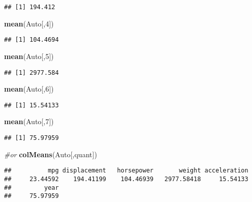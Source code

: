 \documentclass[]{article}
\newenvironment{Shaded}{\begin{snugshade}}{\end{snugshade}}
\newcommand{\CommentTok}[1]{\textcolor[rgb]{0.56,0.35,0.01}{\textit{#1}}}
\newcommand{\DecValTok}[1]{\textcolor[rgb]{0.00,0.00,0.81}{#1}}
\newcommand{\KeywordTok}[1]{\textcolor[rgb]{0.13,0.29,0.53}{\textbf{#1}}}
\newcommand{\NormalTok}[1]{#1}
\begin{document}
\begin{verbatim}
## [1] 194.412
\end{verbatim}

\begin{Shaded}
\begin{Highlighting}[]
\KeywordTok{mean}\NormalTok{(Auto[,}\DecValTok{4}\NormalTok{])}
\end{Highlighting}
\end{Shaded}

\begin{verbatim}
## [1] 104.4694
\end{verbatim}

\begin{Shaded}
\begin{Highlighting}[]
\KeywordTok{mean}\NormalTok{(Auto[,}\DecValTok{5}\NormalTok{])}
\end{Highlighting}
\end{Shaded}

\begin{verbatim}
## [1] 2977.584
\end{verbatim}

\begin{Shaded}
\begin{Highlighting}[]
\KeywordTok{mean}\NormalTok{(Auto[,}\DecValTok{6}\NormalTok{])}
\end{Highlighting}
\end{Shaded}

\begin{verbatim}
## [1] 15.54133
\end{verbatim}

\begin{Shaded}
\begin{Highlighting}[]
\KeywordTok{mean}\NormalTok{(Auto[,}\DecValTok{7}\NormalTok{])}
\end{Highlighting}
\end{Shaded}

\begin{verbatim}
## [1] 75.97959
\end{verbatim}

\begin{Shaded}
\begin{Highlighting}[]
\CommentTok{#or}
\KeywordTok{colMeans}\NormalTok{(Auto[,quant])}
\end{Highlighting}
\end{Shaded}

\begin{verbatim}
##          mpg displacement   horsepower       weight acceleration 
##     23.44592    194.41199    104.46939   2977.58418     15.54133 
##         year 
##     75.97959
\end{verbatim}
\end{document}
